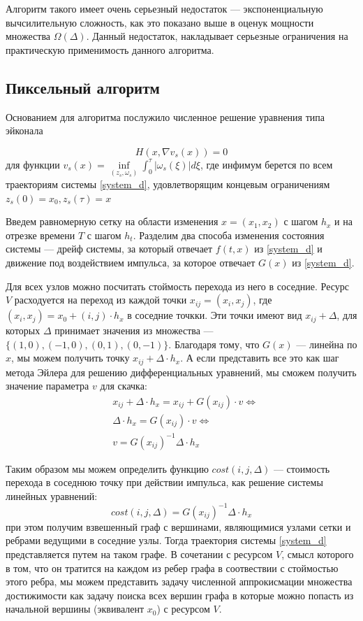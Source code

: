 \documentclass[a4paper,12pt]{article}
\begin{document}
Алгоритм такого имеет очень серьезный недостаток --- экспоненциальную
вычсилительную сложность, как это показано выше в оценук мощности
множества $\Omega(\Delta)$. Данный недостаток, накладывает серьезные
ограничения на практическую применимость данного алгоритма.

\subsection{Пиксельный алгоритм}
\label{sec:wave_alg}

Основанием для алгоритма послужило численное решение уравнения типа
эйконала \cite{S1999} 

\begin{equation*}
    H(x,\nabla v_s(x)) = 0
\end{equation*}
для функции $v_s(x) = \inf \limits_{(z_s,\omega_s)} \int_0^\tau
| \omega_s(\xi) | d\xi$, где инфимум берется по всем траекториям
системы \eqref{system_d}, удовлетворящим концевым ограничениям $z_s(0)
= x_0, z_s(\tau) = x$

Введем равномерную сетку на области изменения $x=(x_1,x_2)$ с шагом
$h_x$ и на отрезке времени $T$ с шагом $h_t$.
Разделим два способа изменения состояния системы — дрейф системы, за
который отвечает $f(t,x)$ из \eqref{system_d} и
движение под воздействием импульса, за которое отвечает $G(x)$ из
\eqref{system_d}.

Для всех узлов можно посчитать стоймость перехода из него в соседние.
Ресурс $V$ расходуется на переход из каждой точки
$x_{ij} = (x_i,x_j)$, где $(x_i,x_j) = x_0 + (i,j)\cdot h_x$ в
соседние точкки. Эти точки имеют вид $x_{ij} +\Delta$, для которых
$\Delta$ принимает значения из множества --- $
\{(1,0),(-1,0),(0,1),(0,-1)\}$.
Благодаря тому, что $G(x)$ --- линейна по $x$, мы можем получить точку
$x_{ij} +\Delta \cdot h_x$. А если представить все это как шаг метода
Эйлера для решению дифференциальных уравнений, мы сможем получить
значение параметра $v$ для скачка:
\begin{eqnarray*}
    &x_{ij} +\Delta \cdot h_x = x_{ij} + G(x_{ij})\cdot v \Leftrightarrow\\
    &\Delta \cdot h_x = G(x_{ij})\cdot v \Leftrightarrow\\
    &v = G(x_{ij})^{-1} \Delta \cdot h_x
\end{eqnarray*}

Таким образом мы можем определить функцию $cost(i,j,\Delta)$ ---
стоимость перехода в соседнюю точку при действии импульса, как решение
системы линейных уравнений:
$$cost(i,j,\Delta) = G(x_{ij})^{-1} \Delta \cdot h_x$$ при этом
получим взвешенный граф с вершинами, являющимися узлами сетки и
ребрами ведущими в соседние узлы. Тогда траектория системы
\eqref{system_d} представляется путем на таком графе. В сочетании с
ресурсом $V$, смысл которого в том, что он тратится на каждом из ребер
графа в соотвествии с стоймостью этого ребра, мы можем представить
задачу численной аппрокисмации множества достижимости как задачу
поиска всех вершин графа в которые можно попасть из начальной вершины
(эквивалент $x_0$) с ресурсом $V$. 
\end{document}
